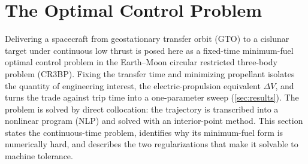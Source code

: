 \documentclass[11pt]{article}
\begin{document}
\section{The Optimal Control Problem}
Delivering a spacecraft from geostationary transfer orbit (GTO) to a cislunar
target under continuous low thrust is posed here as a fixed-time minimum-fuel
optimal control problem in the Earth--Moon circular restricted three-body
problem (CR3BP). Fixing the transfer time and minimizing propellant isolates the
quantity of engineering interest, the electric-propulsion equivalent $\Delta V$,
and turns the trade against trip time into a one-parameter sweep
(\cref{sec:results}). The problem is solved by direct collocation: the trajectory
is transcribed into a nonlinear program (NLP) and solved with an interior-point
method. This section states the continuous-time problem, identifies why its
minimum-fuel form is numerically hard, and describes the two regularizations that
make it solvable to machine tolerance.
\end{document}
